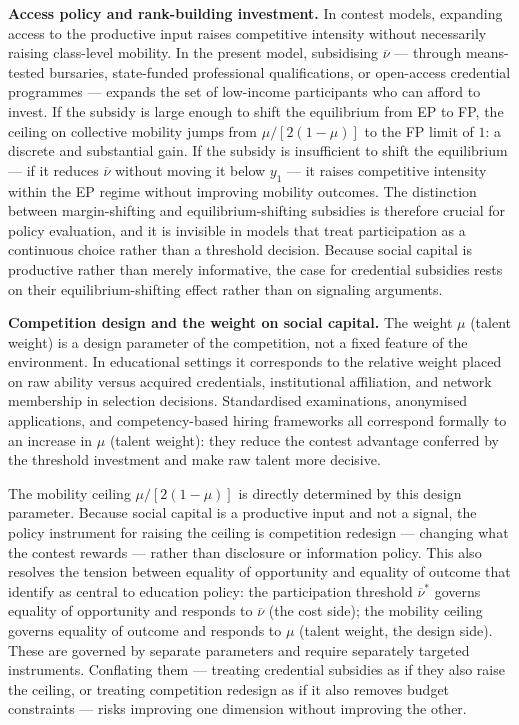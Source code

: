 \documentclass[
    oneside,
    fontsize=10pt,leqno]{article}
\begin{document}
\medskip
\noindent\textbf{Access policy and rank-building investment.}
In contest models, expanding access to the productive input raises
competitive intensity without necessarily raising class-level mobility.
In the present model, subsidising $\overline{\nu}$ --- through
means-tested bursaries, state-funded professional qualifications, or
open-access credential programmes --- expands the set of low-income
participants who can afford to invest. If the subsidy is large enough
to shift the equilibrium from EP to FP, the ceiling on
collective mobility jumps from $\mu/[2(1-\mu)]$ to the FP
limit of $1$: a discrete and substantial gain. If the subsidy is
insufficient to shift the equilibrium --- if it reduces $\overline{\nu}$
without moving it below $y_1$ --- it raises competitive intensity
within the EP regime without improving mobility outcomes. The
distinction between margin-shifting and equilibrium-shifting subsidies
is therefore crucial for policy evaluation, and it is invisible in
models that treat participation as a continuous choice rather than
a threshold decision. Because social capital is productive rather
than merely informative, the case for credential subsidies rests
on their equilibrium-shifting effect rather than on signaling
arguments.

\medskip
\noindent\textbf{Competition design and the weight on social capital.}
The weight $\mu$ (talent weight) is a design parameter of the competition, not a
fixed feature of the environment. In educational settings it
corresponds to the relative weight placed on raw ability versus
acquired credentials, institutional affiliation, and network
membership in selection decisions. Standardised examinations,
anonymised applications, and competency-based hiring frameworks
all correspond formally to an increase in $\mu$ (talent weight): they reduce the
contest advantage conferred by the threshold investment and make
raw talent more decisive.

The mobility ceiling $\mu/[2(1-\mu)]$ is directly determined by
this design parameter. Because social capital is a productive
input and not a signal, the policy instrument for raising the
ceiling is competition redesign --- changing what the contest
rewards --- rather than disclosure or information policy. This
also resolves the tension between equality of opportunity and
equality of outcome that \citet{HeckmanMosso2014} identify as
central to education policy: the participation threshold
$\overline{\nu}^*$ governs equality of opportunity and responds
to $\overline{\nu}$ (the cost side); the mobility ceiling governs
equality of outcome and responds to $\mu$ (talent weight, the design side).
These are governed by separate parameters and require separately
targeted instruments. Conflating them --- treating credential
subsidies as if they also raise the ceiling, or treating
competition redesign as if it also removes budget constraints ---
risks improving one dimension without improving the other.
\end{document}
